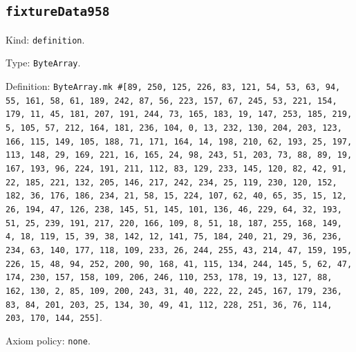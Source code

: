 \documentclass[11pt]{article}
\begin{document}
\subsection*{\texttt{fixtureData958}}
\noindent Kind: \texttt{definition}.\par
\noindent Type: \texttt{ByteArray}.\par
\noindent Definition: \texttt{ByteArray.mk \#[89, 250, 125, 226, 83, 121, 54, 53, 63, 94, 55, 161, 58, 61, 189, 242, 87, 56, 223, 157, 67, 245, 53, 221, 154, 179, 11, 45, 181, 207, 191, 244, 73, 165, 183, 19, 147, 253, 185, 219, 5, 105, 57, 212, 164, 181, 236, 104, 0, 13, 232, 130, 204, 203, 123, 166, 115, 149, 105, 188, 71, 171, 164, 14, 198, 210, 62, 193, 25, 197, 113, 148, 29, 169, 221, 16, 165, 24, 98, 243, 51, 203, 73, 88, 89, 19, 167, 193, 96, 224, 191, 211, 112, 83, 129, 233, 145, 120, 82, 42, 91, 22, 185, 221, 132, 205, 146, 217, 242, 234, 25, 119, 230, 120, 152, 182, 36, 176, 186, 234, 21, 58, 15, 224, 107, 62, 40, 65, 35, 15, 12, 26, 194, 47, 126, 238, 145, 51, 145, 101, 136, 46, 229, 64, 32, 193, 51, 25, 239, 191, 217, 220, 166, 109, 8, 51, 18, 187, 255, 168, 149, 4, 18, 119, 15, 39, 38, 142, 12, 141, 75, 184, 240, 21, 29, 36, 236, 234, 63, 140, 177, 118, 109, 233, 26, 244, 255, 43, 214, 47, 159, 195, 226, 15, 48, 94, 252, 200, 90, 168, 41, 115, 134, 244, 145, 5, 62, 47, 174, 230, 157, 158, 109, 206, 246, 110, 253, 178, 19, 13, 127, 88, 162, 130, 2, 85, 109, 200, 243, 31, 40, 222, 22, 245, 167, 179, 236, 83, 84, 201, 203, 25, 134, 30, 49, 41, 112, 228, 251, 36, 76, 114, 203, 170, 144, 255]}.\par
\noindent Axiom policy: \texttt{none}.\par
\end{document}
